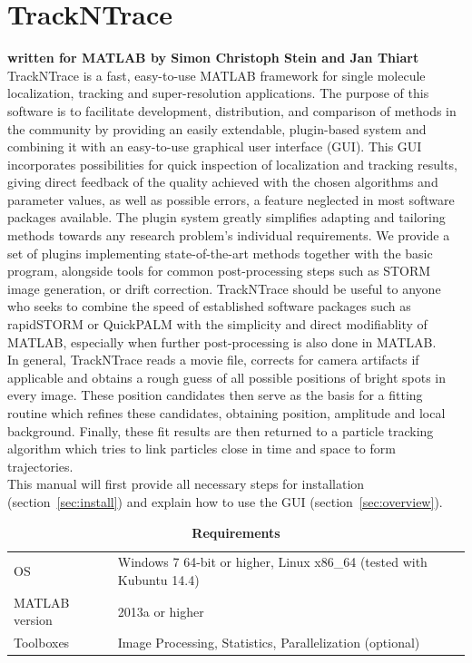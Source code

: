 \documentclass[11pt,onside]{report}
\numberwithin{equation}{chapter}
\begin{document}
\chapter*{TrackNTrace}
\vspace*{-30pt}\textbf{written for MATLAB by Simon Christoph Stein and Jan Thiart}\\ [20pt]
TrackNTrace is a fast, easy-to-use MATLAB framework for single molecule localization, tracking and super-resolution applications. The purpose of this software is to facilitate development, distribution, and comparison of methods in the community by providing an easily extendable, plugin-based system and combining it with an easy-to-use graphical user interface (GUI). This GUI incorporates possibilities for quick inspection of localization and tracking results, giving direct feedback of the quality achieved with the chosen algorithms and parameter values, as well as possible errors, a feature neglected in most software packages available. The plugin system greatly simplifies adapting and tailoring methods towards any research problem's individual requirements. We provide a set of plugins implementing state-of-the-art methods together with the basic program, alongside tools for common post-processing steps such as STORM image generation, or drift correction. TrackNTrace should be useful to anyone who seeks to combine the speed of established software packages such as rapidSTORM or QuickPALM with the simplicity and direct modifiablity of MATLAB, especially when further post-processing is also done in MATLAB.\\
  
In general, TrackNTrace reads a movie file, corrects for camera artifacts if applicable and obtains a rough guess of all possible positions of bright spots in every image. These position candidates then serve as the basis for a fitting routine which refines these candidates, obtaining position, amplitude and local background. Finally, these fit results are then returned to a particle tracking algorithm which tries to link particles close in time and space to form trajectories.\\[10pt]
This manual will first provide all necessary steps for installation (section~\ref{sec:install}) and explain how to use the GUI (section~\ref{sec:overview}). 
\begin{table}[!h]
\centering
\caption*{\textbf{Requirements}}
\label{tab:requirements}
\begin{tabular}{p{} p{}}
\toprule
OS & Windows 7 64-bit or higher, Linux x86\_64 (tested with Kubuntu 14.4) \\[5pt]
MATLAB version & 2013a or higher\\[5pt]
Toolboxes & Image Processing, Statistics, Parallelization (optional) \\[0pt]
\bottomrule
\end{tabular}
\end{table}
\end{document}
